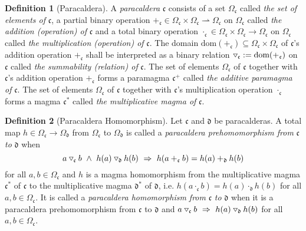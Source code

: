 \documentclass{article}
\theoremstyle{definition}
\newtheorem{definition}{Definition}[section]
\newcommand{\impl}{~\Rightarrow~}
\newcommand{\conj}{~\land~}
\newcommand{\tridown}{\mathbin{\hspace{.1em}\raisebox{.02em}{\rotatebox[origin=c]{90}{$\triangleleft$}}}}
\newcommand{\comp}{\tridown}
\newcommand{\pto}{\rightharpoonup}
\begin{document}
\begin{definition}[Paracaldera]
A \textit{paracaldera} \(\mathfrak{c}\) consists of a set \(\Omega_\mathfrak{c}\) called \textit{the set of elements of} \(\mathfrak{c}\), a partial binary operation \(+_\mathfrak{c}\in\Omega_\mathfrak{c}\times\Omega_\mathfrak{c}\pto\Omega_\mathfrak{c}\) on \(\Omega_\mathfrak{c}\) called \textit{the addition (operation) of} \(\mathfrak{c}\) and a total binary operation \(\cdot_\mathfrak{c}\in\Omega_\mathfrak{c}\times\Omega_\mathfrak{c}\to\Omega_\mathfrak{c}\) on \(\Omega_\mathfrak{c}\) called \textit{the multiplication (operation) of} \(\mathfrak{c}\). The domain \(\text{dom}(+_\mathfrak{c})\subseteq\Omega_\mathfrak{c}\times\Omega_\mathfrak{c}\) of \(\mathfrak{c}\)'s addition operation \(+_\mathfrak{c}\) shall be interpreted as a binary relation \(\comp_\mathfrak{c}:=\text{dom}(+_\mathfrak{c})\) on \(\mathfrak{c}\) called \textit{the summability (relation) of} \(\mathfrak{c}\). The set of elements \(\Omega_\mathfrak{c}\) of \(\mathfrak{c}\) together with \(\mathfrak{c}\)'s addition operation \(+_\mathfrak{c}\) forms a paramagma \(\mathfrak{c}^+\) called \textit{the additive paramagma of} \(\mathfrak{c}\). The set of elements \(\Omega_\mathfrak{c}\) of \(\mathfrak{c}\) together with \(\mathfrak{c}\)'s multiplication operation \(\cdot_\mathfrak{c}\) forms a magma \(\mathfrak{c}^\ast\) called \textit{the multiplicative magma of} \(\mathfrak{c}\).
\end{definition}

\begin{definition}[Paracaldera Homomorphism]
Let \(\mathfrak{c}\) and \(\mathfrak{d}\) be paracalderas. A total map \(h\in\Omega_\mathfrak{c}\to\Omega_\mathfrak{d}\) from \(\Omega_\mathfrak{c}\) to \(\Omega_\mathfrak{d}\) is called a \textit{paracaldera prehomomorphism from} \(\mathfrak{c}\) \textit{to} \(\mathfrak{d}\) when \[a\comp_\mathfrak{c}b\conj h(a)\comp_\mathfrak{d}h(b)\impl h(a+_\mathfrak{c}b)=h(a)+_\mathfrak{d}h(b)\] for all \(a,b\in\Omega_\mathfrak{c}\) and \(h\) is a magma homomorphism from the multiplicative magma \(\mathfrak{c}^\ast\) of \(\mathfrak{c}\) to the multiplicative magma \(\mathfrak{d}^\ast\) of \(\mathfrak{d}\), i.e. \(h(a\cdot_\mathfrak{c}b)=h(a)\cdot_\mathfrak{d}h(b)\) for all \(a,b\in\Omega_\mathfrak{c}\). It is called a \textit{paracaldera homomorphism from} \(\mathfrak{c}\) \textit{to} \(\mathfrak{d}\) when it is a paracaldera prehomomorphism from \(\mathfrak{c}\) to \(\mathfrak{d}\) and \(a\comp_\mathfrak{c}b\impl h(a)\comp_\mathfrak{d}h(b)\) for all \(a,b\in\Omega_\mathfrak{c}\).
\end{definition}
\end{document}
